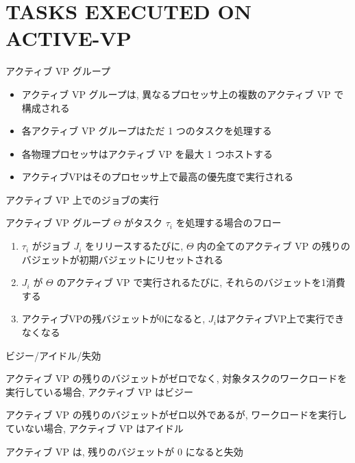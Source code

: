 
\section{TASKS EXECUTED ON ACTIVE-VP}
\label{sec: tasks executed on active-vp}

\begin{frame}{アクティブ VP グループ}
    \begin{itemize}
        \item アクティブ VP グループは, 異なるプロセッサ上の複数のアクティブ VP で構成される
        \item 各アクティブ VP グループはただ 1 つのタスクを処理する
        \item 各物理プロセッサはアクティブ VP を最大 1 つホストする
        \item アクティブVPはそのプロセッサ上で最高の優先度で実行される
    \end{itemize}
\end{frame}

\begin{frame}{アクティブ VP 上でのジョブの実行}
    \begin{block}{アクティブ VP グループ $\Theta$ がタスク $\tau_{i}$ を処理する場合のフロー}
        \setlength{\linewidth}{0.98\columnwidth}
        \begin{enumerate}
            \item $\tau_{i}$ がジョブ $J_{i}$ をリリースするたびに, $\Theta$ 内の全てのアクティブ VP の残りのバジェットが初期バジェットにリセットされる
            \item $J_{i}$ が $\Theta$ のアクティブ VP で実行されるたびに, それらのバジェットを1消費する
            \item アクティブVPの残バジェットが0になると, $J_{i}$はアクティブVP上で実行できなくなる
        \end{enumerate}
    \end{block}
\end{frame}

\begin{frame}{ビジー/アイドル/失効}
    \begin{definition}[ビジー]
        アクティブ VP の残りのバジェットがゼロでなく, 対象タスクのワークロードを実行している場合, アクティブ VP はビジー
    \end{definition}
    \begin{definition}[アイドル]
        アクティブ VP の残りのバジェットがゼロ以外であるが, ワークロードを実行していない場合, アクティブ VP はアイドル
    \end{definition}
    \begin{definition}[失効]
        アクティブ VP は, 残りのバジェットが 0 になると失効
    \end{definition}
\end{frame}

